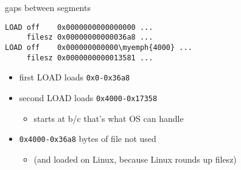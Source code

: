 \begin{frame}[fragile,label=segGaps]{gaps between segments}
\begin{Verbatim}[commandchars=\\\{\}]
LOAD off    0x0000000000000000 ...
     filesz 0x00000000000036a8 ...
LOAD off    0x000000000000\myemph{4000} ...
     filesz 0x0000000000013581 ...
\end{Verbatim}
\begin{itemize}
\item first LOAD loads \texttt{0x0-0x36a8}
\item second LOAD loads \texttt{0x4000-0x17358}
    \begin{itemize}
    \item starts at  b/c that's what OS can handle
    \end{itemize}
\item \texttt{0x4000-0x36a8} bytes of file not used
    \begin{itemize}
    \item<2-> (and loaded on Linux, because Linux rounds up filesz)
    \end{itemize}
\end{itemize}
\end{frame}
